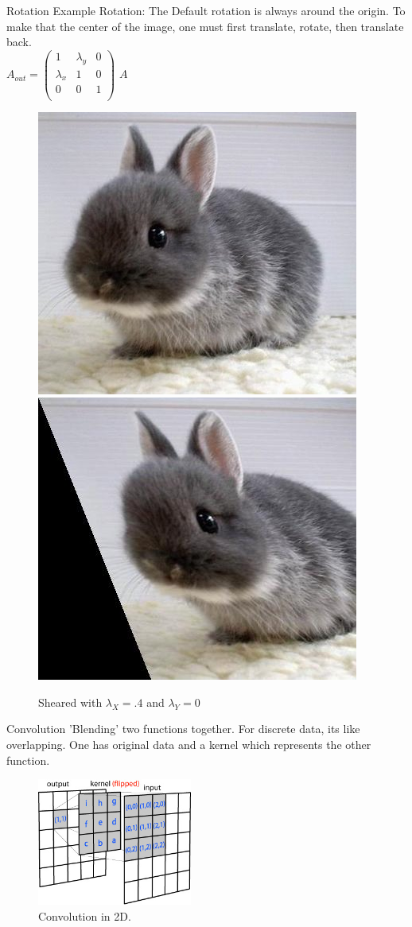 \documentclass{beamer}
\begin{document}
\begin{frame}{Rotation}
Example Rotation:
The Default rotation is always around the origin. To make that the center of the image, one must first translate, rotate, then translate back.
\hspace{0.1 in}
\\
$A_{out} = \begin{pmatrix}
	1 & \lambda_y & 0\\
	\lambda_x & 1 & 0\\
	0 & 0 & 1\\
\end{pmatrix}$
$A$
\\
\begin{figure}

\includegraphics[width = 1.1 in]{bunnycute.jpg}
\hspace{0.5 in}
\includegraphics[width = 1.1 in]{bunnycuteShear.jpg}
\caption{Sheared with $\lambda_X = .4$ and $\lambda_Y = 0$}
\end{figure}

\end{frame}




\begin{frame}{Convolution}
'Blending' two functions together. For discrete data, its like overlapping.
One has original data and a kernel which represents the other function. 
\begin{figure}[htp]
\centering
\includegraphics[width=2in]{conv2d_matrix.jpg}
\caption{Convolution in 2D.}
\label{}
\end{figure}
\end{frame}
\end{document}
